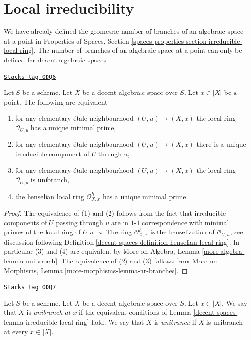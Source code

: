 \section{Local irreducibility}
\label{decent-spaces-section-irreducible-local-ring}
We have already defined the geometric number of branches of an
algebraic space at a point in Properties of Spaces, Section
\ref{spaces-properties-section-irreducible-local-ring}.
The number of branches of an algebraic space at a point can only
be defined for decent algebraic spaces.

\begin{lemma}
\label{decent-spaces-lemma-irreducible-local-ring}
\href{https://stacks.math.columbia.edu/tag/0DQ6}{\texttt{Stacks tag 0DQ6}}

Let $S$ be a scheme. Let $X$ be a decent algebraic space over $S$.
Let $x \in |X|$ be a point. The following are equivalent
\begin{enumerate}
\item for any elementary \'etale neighbourhood $(U, u) \to (X, x)$
the local ring $\mathcal{O}_{U, u}$ has a unique minimal prime,
\item for any elementary \'etale neighbourhood $(U, u) \to (X, x)$
there is a unique irreducible component of $U$ through $u$,
\item for any elementary \'etale neighbourhood $(U, u) \to (X, x)$
the local ring $\mathcal{O}_{U, u}$ is unibranch,
\item the henselian local ring
$\mathcal{O}_{X, x}^h$ has a unique minimal prime.
\end{enumerate}
\end{lemma}

\begin{proof}
The equivalence of (1) and (2) follows from the fact that irreducible
components of $U$ passing through $u$ are in $1$-$1$ correspondence with
minimal primes of the local ring of $U$ at $u$. The ring
$\mathcal{O}_{X, x}^h$ is the henselization of $\mathcal{O}_{U, u}$, see
discussion following Definition \ref{decent-spaces-definition-henselian-local-ring}.
In particular (3) and (4) are equivalent by
More on Algebra, Lemma \ref{more-algebra-lemma-unibranch}.
The equivalence of (2) and (3) follows from
More on Morphisms, Lemma \ref{more-morphisms-lemma-nr-branches}.
\end{proof}

\begin{definition}[Unibranch]
\label{decent-spaces-definition-unibranch}
\href{https://stacks.math.columbia.edu/tag/0DQ7}{\texttt{Stacks tag 0DQ7}}

Let $S$ be a scheme. Let $X$ be a decent algebraic space over $S$.
Let $x \in |X|$. We say that $X$ is {\it unibranch at $x$}
if the equivalent conditions of
Lemma \ref{decent-spaces-lemma-irreducible-local-ring} hold.
We say that $X$ is {\it unibranch} if $X$ is
unibranch at every $x \in |X|$.
\end{definition}

